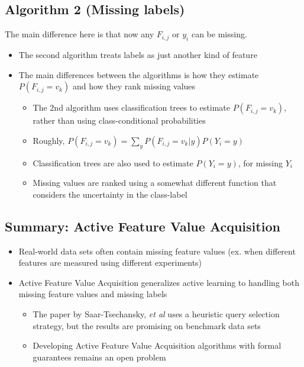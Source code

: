 \documentclass[10pt]{article}
\begin{document}
\subsection*{Algorithm 2 (Missing labels)}
The main difference here is that now any $F_{i, j}$ or $y_i$ can be missing.
\begin{itemize}
	\item The second algorithm treats labels as just another kind of feature
	\item The main differences between the algorithms is how they estimate $P(F_{i, j} = v_k)$ and how they rank missing values
	\begin{itemize}
	    \item The 2nd algorithm uses classification trees to estimate $P(F_{i, j} = v_k)$, rather than using class-conditional probabilities
	    \item Roughly, $P(F_{i, j} = v_k) = \sum_y P(F_{i, j} = v_k | y) P(Y_i = y)$
	    \item Classification trees are also used to estimate $P(Y_i = y)$, for missing $Y_i$
	    \item Missing values are ranked using a somewhat different function that considers the uncertainty in the class-label
    \end{itemize}
\end{itemize}

\subsection*{Summary: Active Feature Value Acquisition}
\begin{itemize}
	\item Real-world data sets often contain missing feature values (ex. when different features are measured using different experiments)
	\item Active Feature Value Acquisition generalizes active learning to handling both missing feature values and missing labels
	\begin{itemize}
	    \item The paper by Saar-Tsechansky, \textit{et al} uses a heuristic query selection strategy, but the results are promising on benchmark data sets
	    \item Developing Active Feature Value Acquisition algorithms with formal guarantees remains an open problem
    \end{itemize}
\end{itemize}
\end{document}
